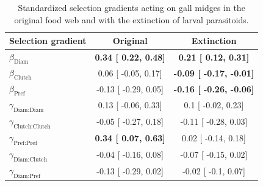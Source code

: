 \documentclass[11pt,]{article}
\begin{document}
\begin{table}[h]
\caption{Standardized selection gradients acting on gall midges in the original food web and with the extinction of larval parasitoids.}
\label{Table:Gradients}
\centering
\begin{tabular}{lcc} %
\\ 
\hline
\textbf{Selection gradient} & \textbf{Original} & \textbf{Extinction}   \\ %
\hline
$\beta_{\text{Diam}}$ & 
\textbf{
0.34 [
0.22,
0.48] }& 
\textbf{
0.21 [
0.12,
0.31] }\\%

$\beta_{\text{Clutch}}$ & 
0.06 [
-0.05,
0.17] & 
\textbf{
-0.09 [
-0.17,
-0.01] }\\%

$\beta_{\text{Pref}}$ &
-0.13 [
-0.29,
0.05] & 
\textbf{
-0.16 [
-0.26,
-0.06] }\\%


$\gamma_{\text{Diam:Diam}}$ &
0.13 [
-0.06,
0.33] & 

0.1 [
-0.02,
0.23] \\%


$\gamma_{\text{Clutch:Clutch}}$ & 
-0.05 [
-0.27,
0.18] & 

-0.11 [
-0.28,
0.03] \\%


$\gamma_{\text{Pref:Pref}}$ & 
\textbf{
0.34 [
0.07,
0.63] }& 

0.02 [
-0.14,
0.18] \\%

$\gamma_{\text{Diam:Clutch}}$ & 
-0.04 [
-0.16,
0.08] & 

-0.07 [
-0.15,
0.02] \\%


$\gamma_{\text{Diam:Pref}}$ & 
-0.13 [
-0.29,
0.02] & 

-0.02 [
-0.1,
0.07] \\%


\end{tabular}
\end{table}
\end{document}
